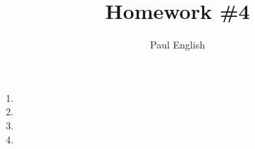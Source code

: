 \documentclass[11pt, oneside]{article}
\title{Homework \#4}
\author{
Paul English \\
}
\begin{document}
\maketitle

\begin{enumerate}

\item 
\item 
\item 
\item 



\end{enumerate}
\end{document}
